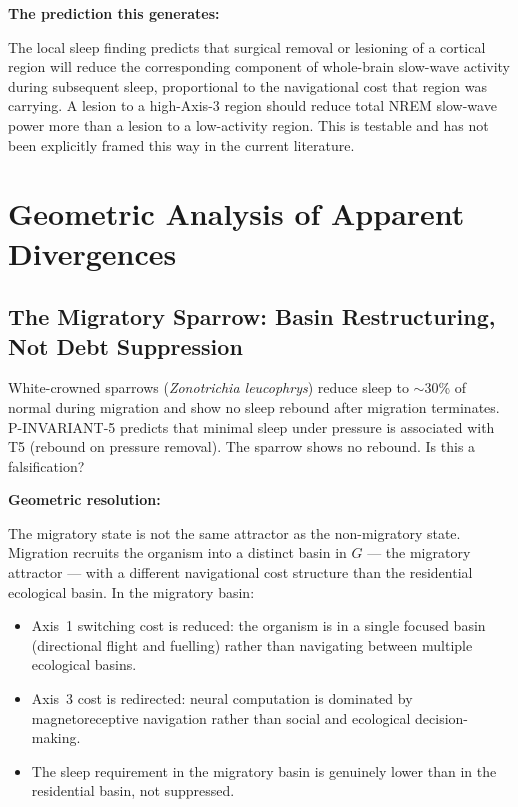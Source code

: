 \documentclass[10pt, a4paper]{article}
\begin{document}
\textbf{The prediction this generates:}

The local sleep finding predicts that
surgical removal or lesioning of a
cortical region will reduce the
corresponding component of whole-brain
slow-wave activity during subsequent
sleep, proportional to the navigational
cost that region was carrying. A lesion
to a high-Axis-3 region should reduce
total NREM slow-wave power more than a
lesion to a low-activity region. This
is testable and has not been explicitly
framed this way in the current literature.

\section{Geometric Analysis of Apparent
Divergences}
\label{sec:divergences}

\subsection{The Migratory Sparrow:
Basin Restructuring, Not Debt Suppression}

White-crowned sparrows (\textit{Zonotrichia
leucophrys}) reduce sleep to $\sim$30\%
of normal during migration and show no
sleep rebound after migration terminates.
P-INVARIANT-5 predicts that minimal sleep
under pressure is associated with T5
(rebound on pressure removal). The sparrow
shows no rebound. Is this a falsification?

\textbf{Geometric resolution:}

The migratory state is not the same
attractor as the non-migratory state.
Migration recruits the organism into a
distinct basin in $G$ --- the migratory
attractor --- with a different navigational
cost structure than the residential
ecological basin. In the migratory basin:

\begin{itemize}[itemsep=0.2em]
  \item Axis~1 switching cost is reduced:
    the organism is in a single focused
    basin (directional flight and fuelling)
    rather than navigating between multiple
    ecological basins.
  \item Axis~3 cost is redirected: neural
    computation is dominated by
    magnetoreceptive navigation rather
    than social and ecological
    decision-making.
  \item The sleep requirement in the
    migratory basin is genuinely lower
    than in the residential basin, not
    suppressed.
\end{itemize}
\end{document}
